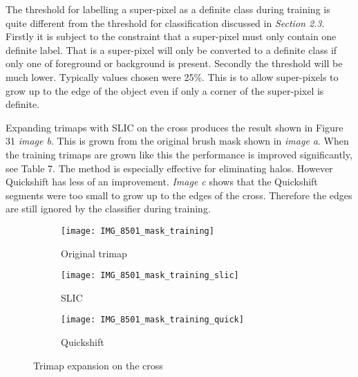 \documentclass[12pt]{IIBproject}
\begin{document}
The threshold for labelling a super-pixel as a definite class during training is quite different from the threshold for classification discussed in \emph{Section 2.3}. Firstly it is subject to the constraint that a super-pixel must only contain one definite label. That is a super-pixel will only be converted to a definite class if only one of foreground or background is present. Secondly the threshold will be much lower. Typically values chosen were 25\%. This is to allow super-pixels to grow up to the edge of the object even if only a corner of the super-pixel is definite.

Expanding trimaps with SLIC on the cross produces the result shown in Figure 31 \emph{image b}. This is grown from the original brush mask shown in \emph{image a}. When the training trimaps are grown like this the performance is improved significantly, see Table 7. The method is especially effective for eliminating halos. However Quickshift has less of an improvement. \emph{Image c} shows that the Quickshift segments were too small to grow up to the edges of the cross. Therefore the edges are still ignored by the classifier during training.
\begin{figure}[H]
\centering
\begin{subfigure}{.45\textwidth}
  \centering
  \texttt{[image: IMG\_8501\_mask\_training]}
  \caption{Original trimap}
  \label{fig:sub1}
\end{subfigure}%
\begin{subfigure}{.45\textwidth}
  \centering
  \texttt{[image: IMG\_8501\_mask\_training\_slic]}
  \caption{SLIC}
  \label{fig:sub2}
\end{subfigure}
\begin{subfigure}{.45\textwidth}
  \centering
  \texttt{[image: IMG\_8501\_mask\_training\_quick]}
  \caption{Quickshift}
  \label{fig:sub2}
\end{subfigure}

\caption{Trimap expansion on the cross}
\label{fig:test}
\end{figure}
\end{document}
